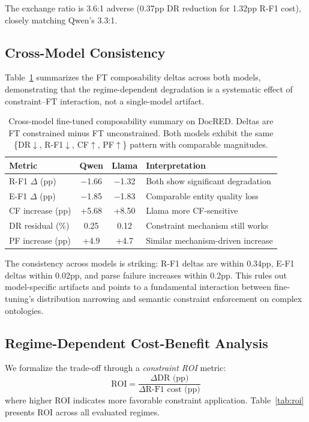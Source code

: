 \documentclass[11pt,a4paper]{article}
\begin{document}
The exchange ratio is 3.6:1 adverse (0.37pp DR reduction for 1.32pp R-F1 cost), closely matching Qwen's 3.3:1.

\subsection{Cross-Model Consistency}

Table~\ref{tab:cross-model} summarizes the FT composability deltas across both models, demonstrating that the regime-dependent degradation is a systematic effect of constraint--FT interaction, not a single-model artifact.

\begin{table}[t]
\centering
\small
\begin{tabular}{lccp{3.8cm}}
\toprule
\textbf{Metric} & \textbf{Qwen} & \textbf{Llama} & \textbf{Interpretation} \\
\midrule
R-F1 $\Delta$ (pp) & $-$1.66 & $-$1.32 & Both show significant degradation \\
E-F1 $\Delta$ (pp) & $-$1.85 & $-$1.83 & Comparable entity quality loss \\
CF increase (pp) & +5.68 & +8.50 & Llama more CF-sensitive \\
DR residual (\%) & 0.25 & 0.12 & Constraint mechanism still works \\
PF increase (pp) & +4.9 & +4.7 & Similar mechanism-driven increase \\
\bottomrule
\end{tabular}
\caption{Cross-model fine-tuned composability summary on DocRED. Deltas are FT constrained minus FT unconstrained. Both models exhibit the same \{DR$\downarrow$, R-F1$\downarrow$, CF$\uparrow$, PF$\uparrow$\} pattern with comparable magnitudes.}
\label{tab:cross-model}
\end{table}

The consistency across models is striking: R-F1 deltas are within 0.34pp, E-F1 deltas within 0.02pp, and parse failure increases within 0.2pp. This rules out model-specific artifacts and points to a fundamental interaction between fine-tuning's distribution narrowing and semantic constraint enforcement on complex ontologies.

\subsection{Regime-Dependent Cost-Benefit Analysis}

We formalize the trade-off through a \emph{constraint ROI} metric:
\begin{equation}
    \text{ROI} = \frac{\Delta \text{DR (pp)}}{\Delta \text{R-F1 cost (pp)}}
\end{equation}
where higher ROI indicates more favorable constraint application. Table~\ref{tab:roi} presents ROI across all evaluated regimes.
\end{document}
